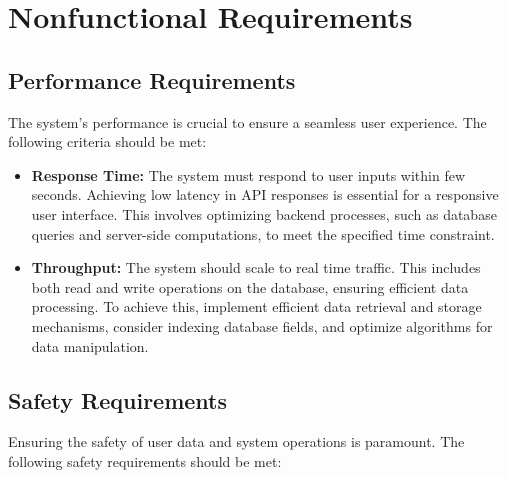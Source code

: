 \documentclass{article}
\begin{document}



\newpage
\section{Nonfunctional Requirements}

\vspace{1em}  %

\subsection{Performance Requirements}
The system's performance is crucial to ensure a seamless user experience. The following criteria should be met:

\vspace{1em}  %

\begin{itemize}
    \item \textbf{Response Time:} The system must respond to user inputs within few seconds. Achieving low latency in API responses is essential for a responsive user interface. This involves optimizing backend processes, such as database queries and server-side computations, to meet the specified time constraint.

    \item \textbf{Throughput:} The system should scale to real time traffic. This includes both read and write operations on the database, ensuring efficient data processing. To achieve this, implement efficient data retrieval and storage mechanisms, consider indexing database fields, and optimize algorithms for data manipulation.
\end{itemize}

\vspace{1em}  %

\subsection{Safety Requirements}
Ensuring the safety of user data and system operations is paramount. The following safety requirements should be met:

\vspace{1em}  %
\end{document}
